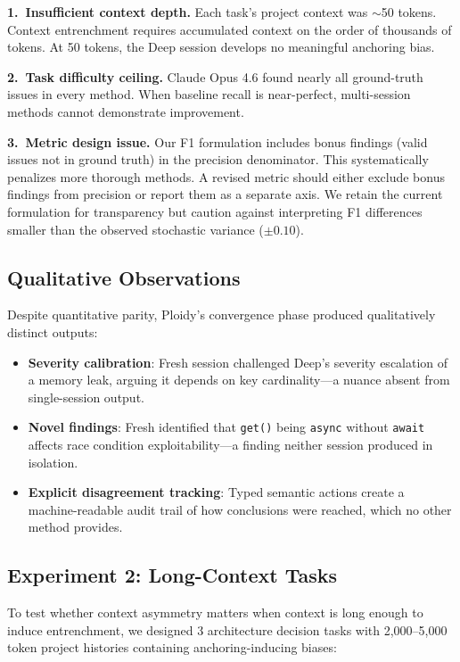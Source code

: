 \documentclass[11pt]{article}
\begin{document}
\textbf{1.\ Insufficient context depth.} Each task's project context was $\sim$50 tokens. Context entrenchment requires accumulated context on the order of thousands of tokens. At 50 tokens, the Deep session develops no meaningful anchoring bias.

\textbf{2.\ Task difficulty ceiling.} Claude Opus 4.6 found nearly all ground-truth issues in every method. When baseline recall is near-perfect, multi-session methods cannot demonstrate improvement.

\textbf{3.\ Metric design issue.} Our F1 formulation includes bonus findings (valid issues not in ground truth) in the precision denominator. This systematically penalizes more thorough methods. A revised metric should either exclude bonus findings from precision or report them as a separate axis. We retain the current formulation for transparency but caution against interpreting F1 differences smaller than the observed stochastic variance ($\pm 0.10$).

\subsection{Qualitative Observations}
\label{sec:qualitative}

Despite quantitative parity, Ploidy's convergence phase produced qualitatively distinct outputs:

\begin{itemize}[leftmargin=1.5em]
  \item \textbf{Severity calibration}: Fresh session challenged Deep's severity escalation of a memory leak, arguing it depends on key cardinality---a nuance absent from single-session output.
  \item \textbf{Novel findings}: Fresh identified that \texttt{get()} being \texttt{async} without \texttt{await} affects race condition exploitability---a finding neither session produced in isolation.
  \item \textbf{Explicit disagreement tracking}: Typed semantic actions create a machine-readable audit trail of how conclusions were reached, which no other method provides.
\end{itemize}

\subsection{Experiment 2: Long-Context Tasks}
\label{sec:exp2}

To test whether context asymmetry matters when context is long enough to induce entrenchment, we designed 3 architecture decision tasks with 2,000--5,000 token project histories containing anchoring-inducing biases:
\end{document}
